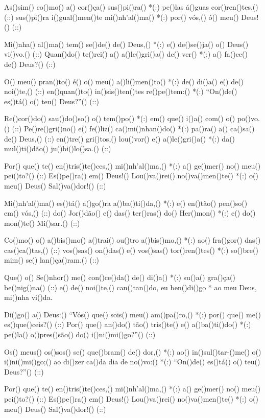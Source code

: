 As()sim() co()mo() a() cor()ça() sus()pi()ra() *(:)
pe()las á()guas cor()ren()tes,() (::)
sus()pi()ra i()gual()men()te mi()nh'al()ma() *(:)
por() vós,() ó() meu() Deus!() (::)

Mi()nha() al()ma() tem() se()de() de() Deus,() *(:)
e() de()se()ja() o() Deus() vi()vo.() (::)
Quan()do() te()rei() a() a()le()gri()a() de() ver() *(:)
a() fa()ce() de() Deus?() (::)

O() meu() pran()to() é() o() meu() a()li()men()to() *(:)
de() di()a() e() de() noi()te,() (::)
en()quan()to() in()sis()ten()tes re()pe()tem:() *(:)
``On()de() es()tá() o() teu() Deus?''() (::)

Re()cor()do() sau()do()so() o() tem()po() *(:)
em() que() i()a() com() o() po()vo.() (::)
Pe()re()gri()no() e() fe()liz() ca()mi()nhan()do() *(:)
pa()ra() a() ca()sa() de() Deus,() (::)
en()tre() gri()tos,() lou()vor() e() a()le()gri()a() *(:)
da() mul()ti()dão() ju()bi()lo()sa.() (::)

Por() que() te() en()tris()te()ces,() mi()nh’al()ma,() *(:)
a() ge()mer() no() meu() pei()to?() (::)
Es()pe()ra() em() Deus!() Lou()va()rei() no()va()men()te() *(:)
o() meu() Deus() Sal()va()dor!() (::)

Mi()nh'al()ma() es()tá() a()go()ra a()ba()ti()da,() *(:)
e() en()tão() pen()so() em() vós,() (::)
do() Jor()dão() e() das() ter()ras() do() Her()mon() *(:)
e() do() mon()te() Mi()sar.() (::)

Co()mo() o() a()bis()mo() a()trai() ou()tro a()bis()mo,() *(:)
ao() fra()gor() das() cas()ca()tas,() (::)
vos()sas() on()das() e() vos()sas() tor()ren()tes() *(:)
so()bre() mim() se() lan()ça()ram.() (::)

Que() o() Se()nhor() me() con()ce()da() de() di()a() *(:)
su()a() gra()ça() be()nig()na() (::)
e() de() noi()te,() can()tan()do, eu ben()di()go *
ao meu Deus, mi()nha vi()da.

Di()go() a() Deus:() ``Vós() que() sois() meu() am()pa()ro,() *(:)
por() que() me() es()que()ceis?() (::)
Por() que() an()do() tão() tris()te() e() a()ba()ti()do() *(:)
pe()la() o()pres()são() do() i()ni()mi()go?''() (::)

Os() meus() os()sos() se() que()bram() de() dor,() *(:)
ao() in()sul()tar-()me() o() i()ni()mi()go;()
ao di()zer ca()da dia de no()vo:() *(:)
``On()de() es()tá() o() teu() Deus?''() (::)

Por() que() te() en()tris()te()ces,() mi()nh'al()ma,() *(:)
a() ge()mer() no() meu() pei()to?() (::)
Es()pe()ra() em() Deus!() Lou()va()rei() no()va()men()te() *(:)
o() meu() Deus() Sal()va()dor!() (::)